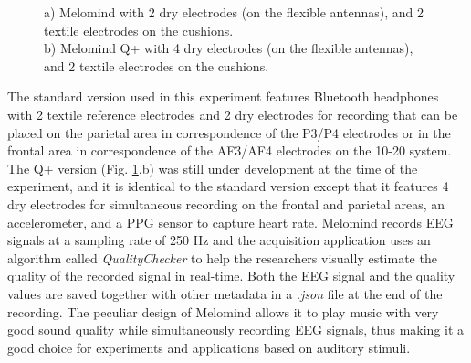  \begin{figure}[!h]
    \centering
{}%
\hfil
{}%
    \caption{a) Melomind with 2 dry electrodes (on the flexible antennas), and 2 textile electrodes on the cushions.  \\ b) Melomind Q+ with 4 dry electrodes (on the flexible antennas), and 2 textile electrodes on the cushions.}
    \label{fig_melomind}%
    \end{figure}

The standard version used in this experiment features Bluetooth headphones with 2 textile reference electrodes and 2 dry electrodes for recording that can be placed on the parietal area in correspondence of the P3/P4 electrodes or in the frontal area in correspondence of the AF3/AF4 electrodes on the 10-20 system. The Q+ version (Fig. \ref{fig_melomind}.b) was still under development at the time of the experiment, and it is identical to the standard version except that it features 4 dry electrodes for simultaneous recording on the frontal and parietal areas, an accelerometer, and a \ac{PPG} sensor to capture heart rate. Melomind records EEG signals at a sampling rate of 250 Hz and the acquisition application uses an algorithm called \emph{QualityChecker} to help the researchers visually estimate the quality of the recorded signal in real-time. Both the \ac{EEG} signal and the quality values are saved together with other metadata in a \emph{.json} file at the end of the recording. The peculiar design of Melomind allows it to play music with very good sound quality while simultaneously recording \ac{EEG} signals, thus making it a good choice for experiments and applications based on auditory stimuli.


